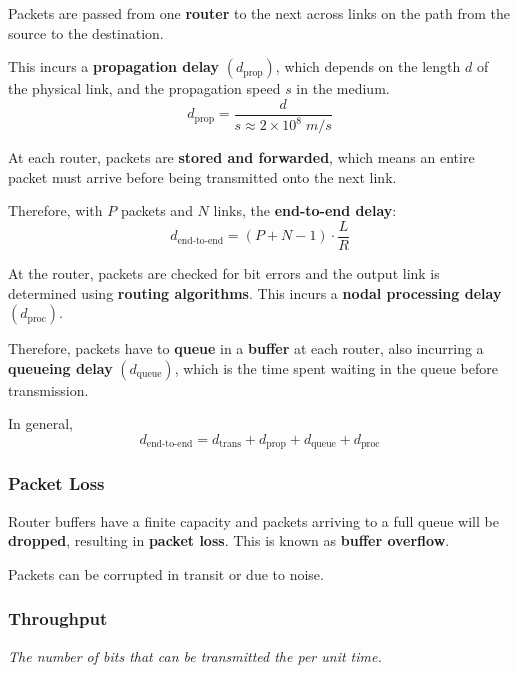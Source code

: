 Packets are passed from one \textbf{router} to the next across links on the path from the source to the destination.

This incurs a \textbf{propagation delay} $\left(d_{\text{prop}}\right)$, which depends on the length $d$ of the physical link,
and the propagation speed $s$ in the medium.\\
\begin{equation*}
    d_{\text{prop}} = \frac{d}{s \approx 2 \times 10^8 \; m/s}
\end{equation*}

At each router, packets are \textbf{stored and forwarded}, which means an entire packet must arrive before being
transmitted onto the next link.

Therefore, with $P$ packets and $N$ links, the \textbf{end-to-end delay}:\\
\begin{equation*}
    d_{\text{end-to-end}} = (P + N - 1) \cdot \frac{L}{R}
\end{equation*}

At the router, packets are checked for bit errors and the output link is determined using \textbf{routing algorithms}.
This incurs a \textbf{nodal processing delay} $\left(d_{\text{proc}}\right)$.

Therefore, packets have to \textbf{queue} in a \textbf{buffer} at each router,
also incurring a \textbf{queueing delay} $\left(d_{\text{queue}}\right)$, which is the time spent waiting in the
queue before transmission.

In general,\\
\begin{equation*}
    d_{\text{end-to-end}} = d_{\text{trans}} + d_{\text{prop}} + d_{\text{queue}} + d_{\text{proc}} 
\end{equation*}

\subsubsection{Packet Loss}
Router buffers have a finite capacity and packets arriving to a full queue will be \textbf{dropped},
resulting in \textbf{packet loss}.
This is known as \textbf{buffer overflow}.

Packets can be corrupted in transit or due to noise.

\subsubsection{Throughput}
\emph{The number of bits that can be transmitted the per unit time.}


